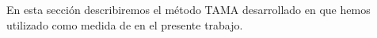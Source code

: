 En esta sección describiremos el método TAMA desarrollado en \cite{KOU2008} que hemos utilizado como medida de \entrainment en el presente trabajo.



